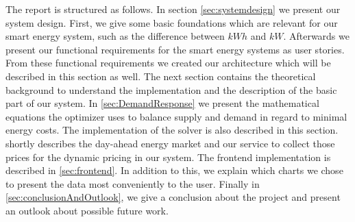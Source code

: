 The report is structured as follows.
In section \ref{sec:systemdesign} we present our system design.
First, we give some basic foundations which are relevant for our smart energy system, such as the difference between $kWh$ and $kW$.
Afterwards we present our functional requirements for the smart energy systems as user stories.
From these functional requirements we created our architecture which will be described in this section as well. The next section contains the theoretical background to understand the implementation and the description of the basic part of our system. 
In \cref{sec:DemandResponse} we present the mathematical equations the optimizer uses to balance supply and demand in regard to minimal energy costs.
The implementation of the solver is also described in this section.
 shortly describes the day-ahead energy market and our service to collect those prices for the dynamic pricing in our system.
The frontend implementation is described in \cref{sec:frontend}.
In addition to this, we explain which charts we chose to present the data most conveniently to the user.
Finally in \cref{sec:conclusionAndOutlook}, we give a conclusion about the project and present an outlook about possible future work. 